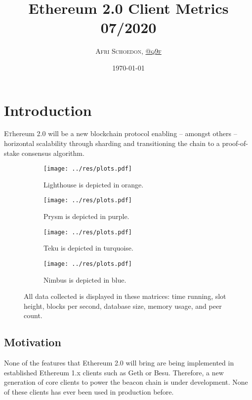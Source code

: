 \documentclass[twoside,twocolumn]{article}
\title{Ethereum 2.0 Client Metrics 07/2020}
\author{\textsc{Afri Schoedon, \href{https://github.com/q9f}{@q9f}}}\date{\today}
\begin{document}
\maketitle
\section{Introduction}
\lettrine[nindent=0em,lines=3]{E}thereum 2.0 will be a new blockchain protocol enabling -- amongst others -- horizontal scalability through sharding and transitioning the chain to a proof-of-stake consensus algorithm.\par

\begin{figure}
   \centering
   \begin{subfigure}[t]{0.48\textwidth}
     \centering
     \texttt{[image: ../res/plots.pdf]}
     \caption{Lighthouse is depicted in orange.}
     \label{img:lh}
   \end{subfigure}
   \begin{subfigure}[t]{0.48\textwidth}
     \centering
     \texttt{[image: ../res/plots.pdf]}
     \caption{Prysm is depicted in purple.}
     \label{img:pr}
   \end{subfigure}
   \begin{subfigure}[t]{0.48\textwidth}
     \centering
     \texttt{[image: ../res/plots.pdf]}
     \caption{Teku is depicted in turquoise.}
     \label{img:tk}
   \end{subfigure}
   \begin{subfigure}[t]{0.48\textwidth}
     \centering
     \texttt{[image: ../res/plots.pdf]}
     \caption{Nimbus is depicted in blue.}
     \label{img:nb}
   \end{subfigure}
  \caption{All data collected is displayed in these matrices: time running, slot height, blocks per second, database size, memory usage, and peer count.}
  \label{fig:cli}
\end{figure}

\subsection{Motivation}
None of the features that Ethereum 2.0 will bring are being implemented in established Ethereum 1.x clients such as Geth or Besu. Therefore, a new generation of core clients to power the beacon chain is under development. None of these clients has ever been used in production before.\par
\end{document}
